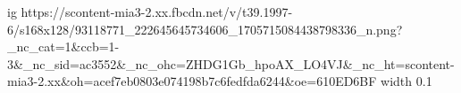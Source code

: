  
 
 
 
 
\ifcmt
  ig https://scontent-mia3-2.xx.fbcdn.net/v/t39.1997-6/s168x128/93118771_222645645734606_1705715084438798336_n.png?_nc_cat=1&ccb=1-3&_nc_sid=ac3552&_nc_ohc=ZHDG1Gb_hpoAX_LO4VJ&_nc_ht=scontent-mia3-2.xx&oh=acef7eb0803e074198b7c6fedfda6244&oe=610ED6BF
  width 0.1
\fi
